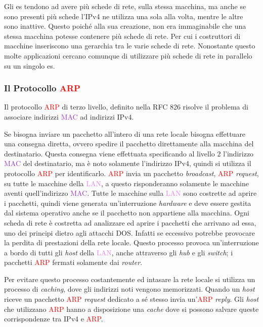 \documentclass{article}
\numberwithin{equation}{subsection}
\begin{document}
Gli \textcolor{Periwinkle}{es} tendono ad avere più schede di rete, sulla stessa macchina, ma anche se sono presenti più schede l'\textcolor{BurntOrange}{IPv4} ne utilizza una sola alla volta, mentre le altre sono 
inattive. Questo poiché alla sua creazione, non era immaginabile che una stessa macchina potesse contenere più schede di rete. Per cui i costruttori di macchine 
inseriscono una gerarchia tra le varie schede di rete. Nonostante questo molte applicazioni cercano comunque di utilizzare più schede di rete in parallelo su un singolo \textcolor{Periwinkle}{es}. 

\subsubsection{Il Protocollo \textcolor{Red}{ARP}}

Il protocollo \textcolor{Red}{ARP} di terzo livello, definito nella RFC 826 risolve il problema di associare indirizzi \textcolor{DarkOrchid}{MAC} ad indirizzi \textcolor{BurntOrange}{IPv4}. 

Se bisogna inviare un pacchetto all'intero di una rete locale bisogna effettuare una consegna diretta, ovvero spedire il pacchetto direttamente alla macchina del 
destinatario. Questa consegna viene effettuata specificando al livello 2 l'indirizzo \textcolor{DarkOrchid}{MAC} del destinatario, ma è noto solamente l'indirizzo \textcolor{BurntOrange}{IPv4}, quindi 
si utilizza il protocollo \textcolor{Red}{ARP} per identificarlo. 
\textcolor{Red}{ARP} invia un pacchetto \textit{broadcast}, \textcolor{Red}{ARP} \textit{request}, su tutte le macchine della \textcolor{violet}{LAN}, a questo risponderanno solamente le macchine aventi quell'indirizzo \textcolor{DarkOrchid}{MAC}. Tutte le macchine sulla \textcolor{violet}{LAN} 
sono costrette ad aprire i pacchetti, quindi viene generata un'interruzione \textit{hardware} e deve essere gestita dal sistema operativo anche se il pacchetto non 
appartiene alla macchina. Ogni scheda di rete è costretta ad analizzare ed aprire i pacchetti che arrivano ad essa, uno dei principi dietro agli attacchi DOS. Infatti se eccessivo potrebbe provocare la perdita di prestazioni della rete locale. 
Questo processo provoca un'interruzione a bordo di tutti gli \textit{host} della \textcolor{violet}{LAN}, anche attraverso gli \textit{hub} e gli \textit{switch}; i pacchetti \textcolor{Red}{ARP} fermati solamente 
dai \textit{router}. 

Per evitare questo processo costantemente ed intasare la rete locale si utilizza un processo di \textit{caching}, dove gli indirizzi noti vengono memorizzati. Quando un \textit{host} riceve un pacchetto 
\textcolor{Red}{ARP} \textit{request} dedicato a sé stesso invia un'\textcolor{Red}{ARP} \textit{reply}. 
Gli \textit{host} che utilizzano \textcolor{Red}{ARP} hanno a disposizione una \textit{cache} dove si possono salvare queste corrispondenze tra \textcolor{BurntOrange}{IPv4} e \textcolor{Red}{ARP}. 
\end{document}

